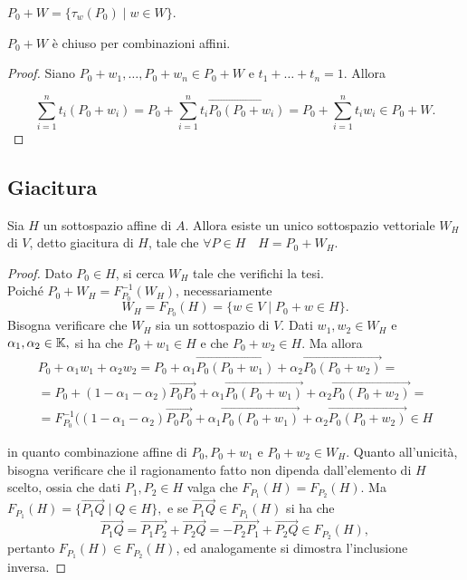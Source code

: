 \documentclass[a4paper,12pt]{article}
\newcommand{\Got}[1]{#1}
\newcommand{\got}[1]{{#1}}
\newcommand{\vet}[1]{\overrightarrow{#1}}
\begin{document}
 \begin{remark}
 \Got{}$\got{P_0+W=\{\tau_w(P_0)\;|\;w\in W\}}$.
 \end{remark}
 
 \vspace{0.5cm}
 
 \begin{proposition}
 \Got{}$\got{P_0+W}$ \Got{è chiuso per combinazioni affini.}
 \end{proposition}
 
 \begin{proof}
 \Got{Siano} $\got{P_0+w_1,\dots,P_0+w_n\in P_0+W}$ \Got{e} $\got{t_1+\ldots+t_n=1}$. \Got{Allora}
 
 \[
	\got{\sum_{i=1}^nt_i(P_0+w_i)=P_0+\sum_{i=1}^nt_i\vet{P_0(P_0+w_i)}=P_0+\sum_{i=1}^nt_iw_i\in P_0+W}.
 \]
 \end{proof}
 
 \subsection{Giacitura}
 
 \begin{proposition}
 \Got{Sia} $\got{H}$ \Got{un sottospazio affine di} $\got{A}$. \Got{Allora esiste un unico sottospazio vettoriale}
 $\got{W_H}$ \Got{di} $\got{V}$, \Got{ detto giacitura di} $\got{H}$, \Got{tale che} $\got{\forall P\in H\quad H=P_0+W_H}$.
 \end{proposition}
 
 \begin{proof}
 \Got{Dato} $\got{P_0\in H}$, \Got{si cerca} $\got{W_H}$ \Got{tale che verifichi la tesi.\\
 Poiché} $\got{P_0+W_H=F^{-1}_{P_0}(W_H)}$, \Got{necessariamente}
 $$
	\got{W_H=F_{P_0}(H)=\{w\in V\;|\; P_0+w\in H\}}.
 $$
 \Got{Bisogna verificare che} $\got{W_H}$ \Got{sia un sottospazio di} $\got{V.}$
 \Got{Dati} $\got{w_1,w_2\in W_H}$ \Got{e} $\got{\alpha_1,\alpha_2\in \K,}$ \Got{si ha che} $\got{P_0+w_1\in H}$ \Got{e che}
 $\got{P_0+w_2\in H}$. \Got{Ma allora}
 \begin{eqnarray*}
	\got{P_0+\alpha_1w_1+\alpha_2w_2=P_0+\alpha_1\vet{P_0(P_0+w_1)}+\alpha_2\vet{P_0(P_0+w_2)}=}\\
	\got{=P_0+(1-\alpha_1-\alpha_2)\vet{P_0P_0}+\alpha_1\vet{P_0(P_0+w_1)}+\alpha_2\vet{P_0(P_0+w_2)}=}\\
	\got{=F^{-1}_{P_0}((1-\alpha_1-\alpha_2)\vet{P_0P_0}+\alpha_1\vet{P_0(P_0+w_1)}+\alpha_2\vet{P_0(P_0+w_2)}\in H}
 \end{eqnarray*}

 \Got{in quanto combinazione affine di} $\got{P_0,P_0+w_1}$ \Got{e} $\got{P_0+w_2\in W_H}$.
 \Got{Quanto all'unicità, bisogna verificare che il ragionamento fatto non dipenda dall'elemento di} $\got{H}$ \Got{scelto, ossia che dati}
 $\got{P_1,P_2\in H}$ \Got{valga che} $\got{F_{P_1}(H)=F_{P_2}(H)}$.
 \Got{Ma} $\got{F_{P_1}(H)=\{\vet{P_1Q}\;|\; Q\in H\},}$ \Got{e se} $\got{\vet{P_1Q}\in F_{P_1}(H)}$ \Got{si ha che}
 $$\got{\vet{P_1Q}=\vet{P_1P_2}+\vet{P_2Q}=-\vet{P_2P_1}+\vet{P_2Q}\in F_{P_2}(H),}$$
 \Got{pertanto} $\got{F_{P_1}(H)\in F_{P_2}(H)}$, \Got{ed analogamente si dimostra l'inclusione inversa.}
 \end{proof}
 
\end{document}
